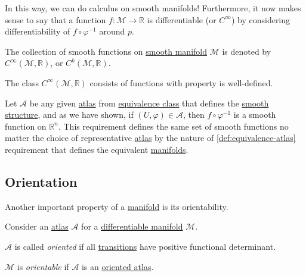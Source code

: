 In this way, we can do calculus on smooth manifolds! Furthermore, it now makes sense to say that a function \(f\colon \mathcal{M} \to \mathbb{R} \) is differentiable (or \(C^{\infty} \)) by considering differentiability of \(f \circ \varphi ^{-1} \) around \(p\).

\begin{notation}
	The collection of smooth functions on \hyperref[def:smooth-manifold]{smooth manifold} \(\mathcal{M} \) is denoted by \(C^{\infty} (\mathcal{M} , \mathbb{R} )\), or \(C^k(\mathcal{M} , \mathbb{R} )\).
\end{notation}

\begin{remark}
	The class \(C^{\infty} (\mathcal{M} , \mathbb{R} )\) consists of functions with property is well-defined.
\end{remark}
\begin{explanation}
	Let \(\mathcal{A} \) be any given \hyperref[def:atlas]{atlas} from \hyperref[def:equivalence-atlas]{equivalence class} that defines the \hyperref[def:smooth-structure]{smooth structure}, and as we have shown, if \((U, \varphi)\in \mathcal{A} \), then \(f \circ \varphi ^{-1} \) is a smooth function on \(\mathbb{R} ^n\). This requirement defines the same set of smooth functions no matter the choice of representative \hyperref[def:atlas]{atlas} by the nature of \autoref{def:equivalence-atlas} requirement that defines the equivalent \hyperref[def:smooth-manifold]{manifolds}.
\end{explanation}

\subsection{Orientation}
Another important property of a \hyperref[def:topological-manifold]{manifold} is its orientability.

\begin{definition*}
	Consider an \hyperref[def:atlas]{atlas} \(\mathcal{A} \) for a \hyperref[def:smooth-manifold]{differentiable manifold} \(\mathcal{M} \).
	\begin{definition}[Oriented]\label{def:oriented}
		\(\mathcal{A} \) is called \emph{oriented} if all \hyperref[def:coordinate-transition]{transitions} have positive functional determinant.
	\end{definition}

	\begin{definition}[Orientable]\label{def:orientable}
		\(\mathcal{M} \) is \emph{orientable} if \(\mathcal{A} \) is an \hyperref[def:oriented]{oriented atlas}.
	\end{definition}
\end{definition*}


